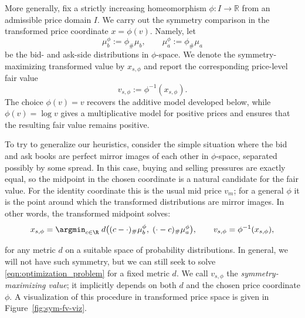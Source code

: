 More generally, fix a strictly increasing homeomorphism $\phi:I\to\mathbb R$ from
an admissible price domain $I$. We carry out the symmetry comparison in the
transformed price coordinate $x=\phi(v)$. Namely, let
%
\[\mu_b^\phi:=\phi_\#\mu_b, \qquad \mu_a^\phi:=\phi_\#\mu_a\]
%
\noindent be the bid- and ask-side distributions in $\phi$-space. We denote the
symmetry-maximizing transformed value by $x_{s,\phi}$ and report the corresponding
price-level fair value
%
\[v_{s,\phi}:=\phi^{-1}(x_{s,\phi}).\]
%
\noindent The choice $\phi(v)=v$ recovers the additive model developed below,
while $\phi(v)=\log v$ gives a multiplicative model for positive prices and
ensures that the resulting fair value remains positive.

To try to generalize our heuristics, consider the simple situation where the bid
and ask books are perfect mirror images of each other in $\phi$-space, separated possibly by some spread. In this case, buying and selling pressures are exactly equal, so the midpoint in the chosen coordinate is a natural candidate for the fair value. For the identity coordinate this is the usual mid price $v_m$; for a general $\phi$ it is the point around which the transformed distributions are mirror images. In other words, the transformed midpoint solves:
%
\begin{equation}
    x_{s,\phi} = \argmin_{c \in \R} \; d\bigl((c-\cdot)_\#\mu_b^\phi, \; (\cdot-c)_\#\mu_a^\phi\bigr),
    \qquad v_{s,\phi}=\phi^{-1}(x_{s,\phi}),
    \label{eqn:optimization_problem}
\end{equation}

%
\noindent for any metric $d$ on a suitable space of probability distributions.
 In general, we will not have such symmetry, but we can still seek to
 solve \eqref{eqn:optimization_problem} for a fixed metric $d$.
 We call $v_{s,\phi}$ the \textit{symmetry-maximizing value}; it implicitly
 depends on both $d$ and the chosen price coordinate $\phi$. A visualization of
 this procedure in transformed price space is given in Figure~\ref{fig:sym-fv-viz}.

